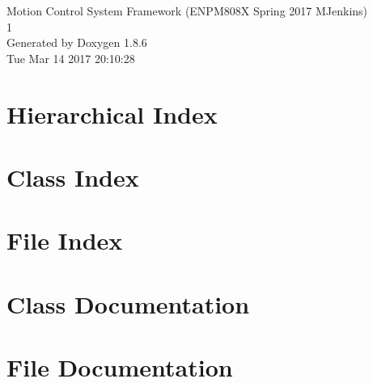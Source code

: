 \documentclass[twoside]{book}
\newcommand{\clearemptydoublepage}{%
  \newpage{\pagestyle{empty}\cleardoublepage}%
}
\begin{document}
\hypersetup{pageanchor=false}
\begin{titlepage}
\vspace*{7cm}
\begin{center}%
{\Large Motion Control System Framework (E\-N\-P\-M808\-X Spring 2017 M\-Jenkins) \\[1ex]\large 1 }\\
\vspace*{1cm}
{\large Generated by Doxygen 1.8.6}\\
\vspace*{0.5cm}
{\small Tue Mar 14 2017 20:10:28}\\
\end{center}
\end{titlepage}
\clearemptydoublepage
\tableofcontents
\clearemptydoublepage
{}
\hypersetup{pageanchor=true}

\chapter{Hierarchical Index}

\chapter{Class Index}

\chapter{File Index}

\chapter{Class Documentation}
















\chapter{File Documentation}



































\newpage
{}
{}
\printindex
\end{document}
